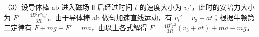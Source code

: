\documentclass[\gkver]{gaokaozhenti}
\begin{document}
\begin{enumerate}
{（3）设导体棒 ab 进入磁场 Ⅱ 后经过时间 $t$ 的速度大小为 $v_{t}'$，此时的安培力大小为 $F'=\frac{4B^{2}r^{2}v_{t}'}{3R}$。由于导体棒 ab 做匀加速直线运动，有 $v_{t}'=v_{3}+at$；根据牛顿第二定律有 $F+mg-F'=ma$，由以上各式解得 $F=\frac{4B^{2}r^{2}}{3R}(v_{3}+at)+ma-mg$。
}

\end{enumerate}
\end{document}

